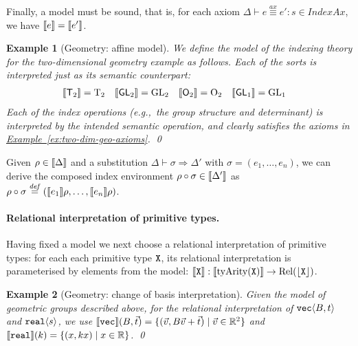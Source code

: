 \documentclass{sigplanconf}
\newcommand{\GL}[1]{\mathrm{GL}_#1}
\newcommand{\SynGL}[1]{\mathsf{GL}_#1}
\newcommand{\Orth}[1]{\mathrm{O}_#1}
\newcommand{\SynOrth}[1]{\mathsf{O}_#1}
\newcommand{\Transl}[1]{\mathrm{T}_#1}
\newcommand{\SynTransl}[1]{\mathsf{T}_#1}
\newcommand{\sepbar}{\mathrel|}
\newcommand{\Rel}{\mathrm{Rel}}
\newcommand{\IndexAxiomSet}{\mathit{IndexAx}}
\newcommand{\tyPrim}[2]{\textup{\texttt{#1}}\langle #2 \rangle}
\newcommand{\tyPrimNm}[1]{\textup{\texttt{#1}}}
\newcommand{\primTyArity}{\mathrm{tyArity}}
\newcommand{\tyPrimSem}[1]{\left\lfloor #1 \right\rfloor}
\newcommand{\exref}[1]{\hyperref[#1]{Example~\ref*{#1}}}
\newcommand{\isDefinedAs}{\stackrel{\mathit{def}}=}
\theoremstyle{examplestyle}
\newtheorem*{example*}{Example}
\theoremstyle{restatementstyle}
\begin{document}
Finally, a model
must be sound, that is, for each axiom $\Delta \vdash e \stackrel{ax}\equiv e' : s \in
\IndexAxiomSet$, we have $\llbracket e \rrbracket = \llbracket e' \rrbracket$. 

\begin{example*}[Geometry: affine model]
We define the model
of the indexing theory for the two-dimensional
geometry example as follows. Each of the sorts is interpreted just as
its semantic counterpart: 
\begin{align*}
\semSort{\SynTransl{2}} & = \Transl{2}
&\semSort{\SynGL{2}} & = \GL{2} &
\semSort{\SynOrth{2}} & = \Orth{2}
&\semSort{\SynGL{1}} & = \GL{1}
\end{align*}
Each of the index operations (e.g.,~the group structure and
determinant) is interpreted by the intended semantic operation, and
clearly satisfies the axioms in \exref{ex:two-dim-geo-axioms}. 
\qed
\end{example*}

Given $\rho \in \llbracket \Delta \rrbracket$ and a substitution
$\Delta \vdash \sigma \Rightarrow \Delta'$ with $\sigma = (e_1,\ldots,e_n)$, 
we can derive the composed
index environment $\rho \circ \sigma
\in \llbracket \Delta' \rrbracket$ as $\rho \circ \sigma \isDefinedAs (\semIndexExp{e_1}\rho,\ldots,\semIndexExp{e_n}\rho)$.


\paragraph{Relational interpretation of primitive types.}
Having fixed a model
we next choose a relational interpretation 
of
primitive types: for each each primitive type
$\tyPrimNm{X}$, its relational interpretation is parameterised by elements
from the model: $\semPrimType{\tyPrimNm{X}} :
\semSort{\primTyArity(\tyPrimNm{X})} \to \Rel(\tyPrimSem{\tyPrimNm{X}})$. 

\begin{example*}[Geometry: change of basis interpretation]
Given the model of geometric groups described above,
for the relational interpretation  of $\tyPrim{vec}{B,t}$ and
$\tyPrim{real}{s}$, we use $\semPrimType{\tyPrimNm{vec}}(B,\vec{t}) = \{
(\vec{v}, B\vec{v} + \vec{t}) \sepbar \vec{v} \in \mathbb{R}^2 \}$ and
$\semPrimType{\tyPrimNm{real}}(k) = \{ (x, kx) \sepbar x \in \mathbb{R} \}$.
\qed
\end{example*}
\end{document}

